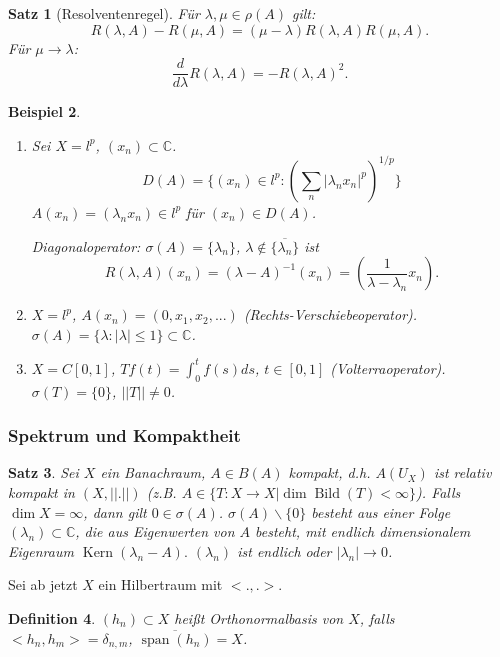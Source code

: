 \documentclass[12pt]{extreport} %
\newtheorem{Satz}{Satz}[subsection]
\newtheorem{Definition}[Satz]{Definition}
\newtheorem{Beispiel}[Satz]{Beispiel}
\DeclareMathOperator{\Kern}{Kern}
\DeclareMathOperator{\Bild}{Bild}
\DeclareMathOperator{\spann}{span}
\numberwithin{equation}{section}
\newcommand{\C}{\mathbb{C}} %
\begin{document}
	
	\begin{Satz}[Resolventenregel]
		Für $\lambda,\mu\in \rho(A)$ gilt:
		$$R(\lambda,A)-R(\mu,A) = (\mu-\lambda)R(\lambda,A)R(\mu,A).$$
		Für $\mu\rightarrow \lambda$:
		$$\frac{d}{d\lambda}R(\lambda,A) = -R(\lambda,A)^2.$$
	\end{Satz}
	
	\begin{Beispiel}~
		\begin{enumerate}
			\item[a)] Sei $X=l^p$, $(x_n)\subset\C$.
			$$D(A) = \{(x_n)\in l^p: (\sum_n |\lambda_n x_n|^p)^{1/p} \}$$
			$A(x_n) = (\lambda_n x_n)\in l^p$ für $(x_n)\in D(A)$.
			
			Diagonaloperator: $\sigma(A) = \{\lambda_n\}$, $\lambda\notin \overline{\{\lambda_n\}}$ ist 
			$$R(\lambda,A)(x_n) = (\lambda-A)^{-1}(x_n) = (\frac{1}{\lambda-\lambda_n}x_n).$$
			\item[b)] $X=l^p$, $A(x_n) = (0,x_1,x_2,...)$ (Rechts-Verschiebeoperator). $\sigma(A) = \{\lambda:|\lambda|\leq 1 \}\subset \C$. 
			\item[c)] $X = C[0,1]$, $Tf(t) = \int_0^t f(s)ds$, $t\in [0,1]$ (Volterraoperator). $\sigma(T) = \{0\}$, $||T|| \neq 0$.
		\end{enumerate}
	\end{Beispiel}
	
	\subsubsection{Spektrum und Kompaktheit}
	
	\begin{Satz}
		Sei $X$ ein Banachraum, $A\in B(A)$ kompakt, d.h. $A(U_X)$ ist relativ kompakt in $(X,||.||)$ (z.B. $A\in \{T: X\rightarrow X |\dim\Bild(T)<\infty \}$). Falls $\dim X = \infty$, dann gilt $0\in \sigma(A)$. $\sigma(A)\backslash \{0\}$ besteht aus einer Folge $(\lambda_n)\subset \C$, die aus Eigenwerten von $A$ besteht, mit endlich dimensionalem Eigenraum $\Kern(\lambda_n-A).$ $(\lambda_n)$ ist endlich oder $|\lambda_n|\rightarrow 0$.
	\end{Satz}
	
	Sei ab jetzt $X$ ein Hilbertraum mit $<.,.>$. 
	
	\begin{Definition}
		$(h_n)\subset X$ heißt Orthonormalbasis von $X$, falls $<h_n, h_m> = \delta_{n,m}$, $\overline{\spann(h_n)} = X$.
	\end{Definition}
	
\end{document}
